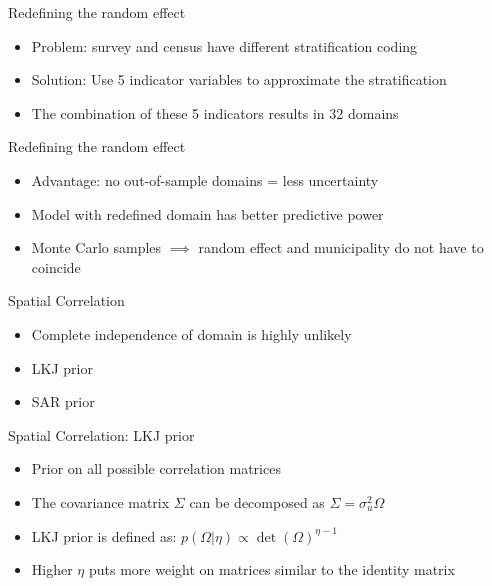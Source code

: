 \begin{frame}{Redefining the random effect}
    \begin{itemize}
        \item Problem: survey and census have different stratification coding
        \item Solution: Use 5 indicator variables to approximate the stratification
        \item The combination of these 5 indicators results in 32 domains
    \end{itemize}
\end{frame}

\begin{frame}{Redefining the random effect}
    \begin{itemize}
        \item Advantage: no out-of-sample domains = less uncertainty
        \item Model with redefined domain has better predictive power
        \item Monte Carlo samples $\implies$ random effect and municipality do not have to coincide
    \end{itemize}
\end{frame}

\begin{frame}{Spatial Correlation}
    \begin{itemize}
        \item Complete independence of domain is highly unlikely
        \item LKJ prior
        \item SAR prior \cite{chung_bayesian_2020}
    \end{itemize}
\end{frame}

\begin{frame}{Spatial Correlation: LKJ prior}
    \begin{itemize}
        \item Prior on all possible correlation matrices
        \item The covariance matrix $\Sigma$ can be decomposed as $\Sigma = \sigma_u^2\Omega$
        \item LKJ prior is defined as: $p(\Omega|\eta) \propto \det(\Omega)^{\eta - 1}$
        \item Higher $\eta$ puts more weight on matrices similar to the identity matrix
    \end{itemize}
\end{frame}


